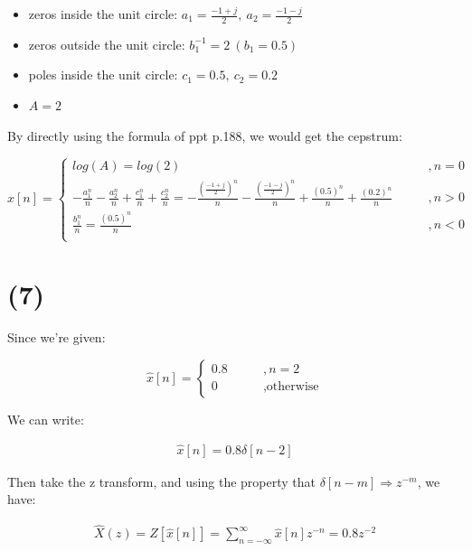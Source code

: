 \documentclass{article}
\begin{document}
\begin{itemize}
    \item zeros inside the unit circle: $a_1 = \frac{-1 + j}{2}, \ a_2 = \frac{-1 - j}{2}$
    \item zeros outside the unit circle: $b_1^{-1} = 2 \ (b_1 = 0.5)$
    \item poles inside the unit circle: $c_1 = 0.5, \ c_2 = 0.2$
    \item $A = 2$
\end{itemize}

By directly using the formula of ppt p.188, we would get the cepstrum:

\begin{equation*}
\hat{x}[n] = 
    \begin{cases}
    log(A) = log(2) \qquad &,n = 0\\
    - \frac{a_1^n}{n} - \frac{a_2^n}{n} + \frac{c_1^n}{n} + \frac{c_2^n}{n} = - \frac{(\frac{-1 + j}{2})^n}{n} - \frac{(\frac{-1 - j}{2})^n}{n} + \frac{(0.5)^n}{n} + \frac{(0.2)^n}{n} \qquad &,n > 0\\
    \frac{b_1^n}{n} =  \frac{(0.5)^n}{n} \qquad &,n < 0\\
    \end{cases}
\end{equation*}

\section*{(7)}

Since we're given:

\begin{equation*}
\hat{x}[n] = 
    \begin{cases}
    0.8 \qquad &,n = 2 \\
    0 &, \text{otherwise}
\end{cases}
\end{equation*}

We can write:

\begin{align*}
    \hat{x}[n] = 0.8 \delta[n - 2]
\end{align*}

Then take the z transform, and using the property that $\delta[n - m] \Rightarrow z^{-m}$, we have:

\begin{align*}
    \hat{X}(z) = Z[\hat{x}[n]] = \sum_{n=-\infty}^{\infty} \hat{x}[n] z^{-n} = 0.8 z^{-2}
\end{align*}
\end{document}
